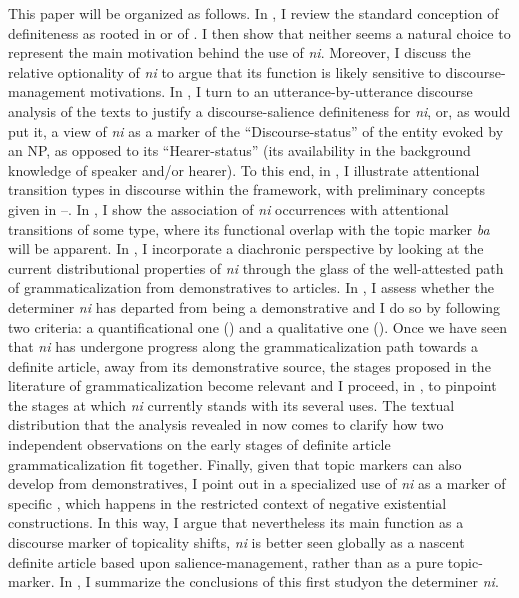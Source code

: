 \documentclass[output=paper
,modfonts
,nonflat]{langsci/langscibook}
\begin{document}
This paper will be organized as follows. In , I review the standard conception of definiteness as rooted in  or  of . I then show that neither seems a natural choice to represent the main motivation behind the use of \textit{ni}. Moreover, I discuss the relative optionality of \textit{ni} to argue that its function is likely sensitive to discourse-management motivations. In , I turn to an utterance-by-utterance discourse analysis of the texts to justify a discourse-salience definiteness for \textit{ni}, or, as \citet{WalkerPrince1996} would put it, a view of \textit{ni} as a marker of the ``Discourse-status'' of the entity evoked by an NP, as opposed to its ``Hearer-status'' (its availability in the background knowledge of speaker and/or hearer). To this end, in , I illustrate attentional transition types in  discourse within the  framework, with preliminary concepts given in --. In , I show the association of \textit{ni} occurrences with attentional transitions of some type, where its functional overlap with the topic marker \textit{ba} will be apparent. In , I incorporate a diachronic perspective by looking at the current distributional properties of \textit{ni} through the glass of the well-attested path of grammaticalization from demonstratives to articles. In , I assess whether the determiner \textit{ni} has departed from being a demonstrative and I do so by following two criteria: a quantificational one () and a qualitative one (). Once we have seen that \textit{ni} has undergone progress along the grammaticalization path towards a definite article, away from its demonstrative source, the stages proposed in the literature of grammaticalization become relevant and I proceed, in , to pinpoint the stages at which \textit{ni} currently stands with its several uses. The textual distribution that the  analysis revealed in  now comes to clarify how two independent observations on the early stages of definite article grammaticalization fit together. Finally, given that topic markers can also develop from demonstratives, I point out in  a specialized use of \textit{ni} as a marker of specific , which happens in the restricted context of negative existential constructions. In this way, I argue that nevertheless its main function as a discourse marker of topicality shifts, \textit{ni} is better seen globally as a nascent definite article based upon salience-management, rather than as a pure topic-marker. In , I summarize the conclusions of this first study\largerpage on the determiner \textit{ni}. 
\end{document}
